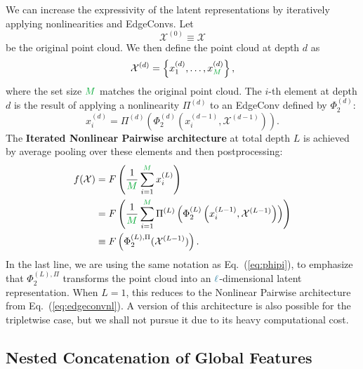 \documentclass[aps,prd,twocolumn,superscriptaddress,floatfix,longbibliography,preprintnumbers,nofootinbib]{revtex4-1} %
\DeclareRobustCommand{\Eq}[1]{Eq.~(\ref{eq:#1})}
\begin{document}
      
      We can increase the expressivity of the latent representations by iteratively applying nonlinearities and EdgeConvs.
      Let
       \begin{equation}
      \mathcal X^{(0)} \equiv \mathcal X
      \end{equation}
      be the original point cloud.
      We then define the point cloud at depth $d$ as
      \begin{equation}
        \mathcal X^{(d)}  = \left\{ x_1^{(d)},\dots, x_{{\color{c2}M}}^{(d)} \right\},
      \end{equation}
      where the set size ${\color{c2}M}$ matches the original point cloud.
      The $i$-th element at depth $d$ is the result of applying a nonlinearity $\Pi^{(d)}$ to an EdgeConv defined by $\Phi_2^{(d)}$:
      \begin{equation}
      \label{eq:nestedeq}
          x^{(d)}_i =  \Pi^{(d)}\left( \Phi_2^{(d)}\left(x_i^{(d-1)},\mathcal X^{(d-1)}  \right)  \right).
      \end{equation}
      The \textbf{Iterated Nonlinear Pairwise architecture} at total depth $L$ is achieved by average pooling over these elements and then postprocessing: 
      \begin{align}
        \nonumber
        f(\mathcal X) &= F \left(\frac{1}{{\color{c2}M}} \sum_{i=1}^{{\color{c2} M}} x^{(L)}_i \right) \\
        \nonumber &= F \left( \frac{1}{{\color{c2}M}}\sum_{i=1}^{{\color{c2}M}}\Pi^{(L)} \left( \Phi_2^{(L)} \left( x_i^{(L-1)}, \mathcal X^{(L-1)} \right)  \right)  \right) \\
                               &\equiv F \left( \Phi_2^{(L),\Pi}(\mathcal X^{(L-1)}) \right).
    \label{eq:iteratedecnl}
    \end{align}
      In the last line, we are using the same notation as \Eq{phipi}, to emphasize that $\Phi_2^{(L),\Pi}$ transforms the point cloud into an ${{\color{c3}\ell}}$-dimensional latent representation. 
      When \(L=1\), this reduces to the Nonlinear Pairwise architecture from \Eq{edgeconvnl}.
      A version of this architecture is also possible for the tripletwise case, but we shall not pursue it due to its heavy computational cost. 
      
      

\subsection{Nested Concatenation of Global Features}
      \label{sec:global}
      
\end{document}
